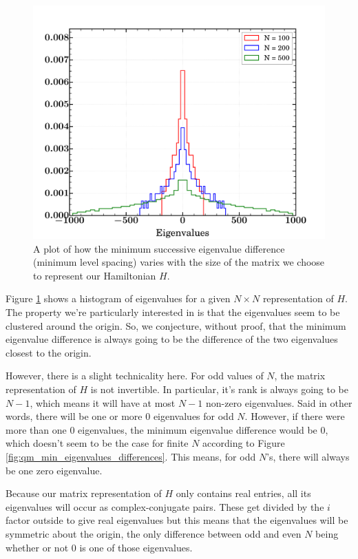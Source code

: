 \documentclass{amsproc}
\theoremstyle{definition}
\theoremstyle{remark}
\numberwithin{equation}{section}
\begin{document}
\begin{figure}
\includegraphics[width=\columnwidth]{figures/qm_eigenvalues.pdf}
\caption{A plot of how the minimum successive eigenvalue difference (minimum level spacing) varies with the size of the matrix we choose to represent our Hamiltonian $H$. }
\label{fig:qm_eigenvalues}
\end{figure}

Figure \ref{fig:qm_eigenvalues} shows a histogram of eigenvalues for a given $N \times N$ representation of $H$. The property we're particularly interested in is that the eigenvalues seem to be clustered around the origin. So, we conjecture, without proof, that the minimum eigenvalue difference is always going to be the difference of the two eigenvalues closest to the origin. 

However, there is a slight technicality here. For odd values of $N$, the matrix representation of $H$ is not invertible. In particular, it's rank is always going to be $N - 1$, which means it will have at most $N - 1$ non-zero eigenvalues. Said in other words, there will be one or more $0$ eigenvalues for odd $N$. However, if there were more than one $0$ eigenvalues, the minimum eigenvalue difference would be $0$, which doesn't seem to be the case for finite $N$ according to Figure \ref{fig:qm_min_eigenvalues_differences}. This means, for odd $N$'s, there will always be one zero eigenvalue. 

Because our matrix representation of $H$ only contains real entries, all its eigenvalues will occur as complex-conjugate pairs. These get divided by the $i$ factor outside to give real eigenvalues but this means that the eigenvalues will be symmetric about the origin, the only difference between odd and even $N$ being whether or not $0$ is one of those eigenvalues. 
\end{document}
